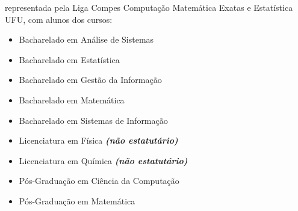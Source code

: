 \begin{article}
\begin{description}[noitemsep]
		\item[UFU] representada pela Liga Compes Computação Matemática Exatas e Estatística UFU, com alunos dos cursos:
		\begin{itemize}[noitemsep]
			\item Bacharelado em Análise de Sistemas
			\item Bacharelado em Estatística
			\item Bacharelado em Gestão da Informação
			\item Bacharelado em Matemática
			\item Bacharelado em Sistemas de Informação
			\item Licenciatura em Física \textbf{\textit{(não estatutário)}}
			\item Licenciatura em Química \textbf{\textit{(não estatutário)}}
			\item Pós-Graduação em Ciência da Computação
			\item Pós-Graduação em Matemática
		\end{itemize}
	\end{description}
\end{article}
